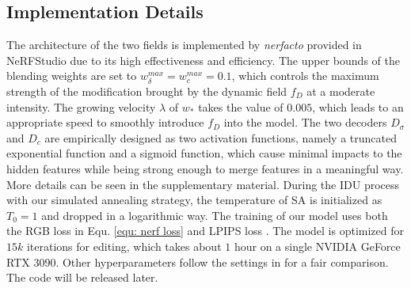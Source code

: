 
\subsection{Implementation Details}
\label{sec: Implementation Details}
The architecture of the two fields is implemented by \textit{nerfacto} provided in NeRFStudio \cite{nerfstudio} due to its high effectiveness and efficiency. The upper bounds of the blending weights are set to $w^{max}_{\delta} = w^{max}_c = 0.1$, which controls the maximum strength of the modification brought by the dynamic field $f_D$ at a moderate intensity. The growing velocity $\lambda$ of $w_*$ takes the value of $0.005$, which leads to an appropriate speed to smoothly introduce $f_D$ into the model. The two decoders $D_{\sigma}$ and $D_{c}$ are empirically designed as two activation functions, namely a truncated exponential function and a sigmoid function, which cause minimal impacts to the hidden features while being strong enough to merge features in a meaningful way. More details can be seen in the supplementary material. During the IDU process with our simulated annealing strategy, the temperature of SA is initialized as $T_0 = 1$ and dropped in a logarithmic way. The training of our model uses both the RGB loss in Equ. \ref{equ: nerf loss} and LPIPS loss \cite{8578166}. The model is optimized for $15k$ iterations for editing, which takes about $1$ hour on a single NVIDIA GeForce RTX 3090. Other hyperparameters follow the settings in \cite{haque2023instruct} for a fair comparison. The code will be released later.
